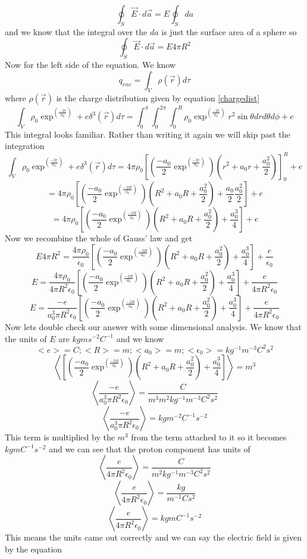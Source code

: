 \documentclass[11pt]{article}
\numberwithin{equation}{section}
\newcommand{\expmess}{\exp^{\left(\frac{-2r}{a_0}\right)}}
\begin{document}
\begin{enumerate}[(a)]
$$\oint_S \vec{E} \cdot d\vec{a} = E\oint_S da$$
and we know that the integral over the $da$ is just the surface area of a sphere so
$$\oint_S \vec{E} \cdot d\vec{a} = E4\pi R^2$$
Now for the left side of the equation. We know 
$$q_{enc} = \int_V \rho(\vec{r}) d\tau$$
where $\rho(\vec{r})$ is the charge distribution given by equation \ref{chargedist}
$$\int_V \rho_0\exp^{\left(\frac{-2r}{a_0}\right)} + e\delta^3(\vec{r})d\tau = \int_0^{\pi}\int_0^{2\pi}\int_0^R \rho_0\exp^{\left(\frac{-2r}{a_0}\right)}r^2\sin{\theta}drd\theta d\phi + e$$
This integral looks familiar. Rather than writing it again we will skip past the integration
$$\int_V \rho_0\exp^{\left(\frac{-2r}{a_0}\right)} + e\delta^3(\vec{r})d\tau = 4\pi\rho_0\left[\left(\frac{-a_0}{2}\expmess\right)\left(r^2 + a_0 r+ \frac{a_0^2}{2}\right)\right]_0^R+ e$$
$$= 4\pi\rho_0\left[\left(\frac{-a_0}{2}\exp^{\left(\frac{-2R}{a_0}\right)}\right)\left(R^2 + a_0 R+ \frac{a_0^2}{2}\right) + \frac{a_0}{2}\frac{a_0^2}{2}\right]+ e$$
$$= 4\pi\rho_0\left[\left(\frac{-a_0}{2}\exp^{\left(\frac{-2R}{a_0}\right)}\right)\left(R^2 + a_0 R+ \frac{a_0^2}{2}\right) + \frac{a_0^3}{4}\right]+ e$$
Now we recombine the whole of Gauss' law and get
$$E4\pi R^2 = \frac{4\pi\rho_0}{\epsilon_0}\left[\left(\frac{-a_0}{2}\exp^{\left(\frac{-2R}{a_0}\right)}\right)\left(R^2 + a_0 R+ \frac{a_0^2}{2}\right) + \frac{a_0^3}{4}\right]+ \frac{e}{\epsilon_0}$$
$$E = \frac{4\pi\rho_0}{4\pi R^2\epsilon_0}\left[\left(\frac{-a_0}{2}\exp^{\left(\frac{-2R}{a_0}\right)}\right)\left(R^2 + a_0 R+ \frac{a_0^2}{2}\right) + \frac{a_0^3}{4}\right]+ \frac{e}{4\pi R^2\epsilon_0}$$
$$E = \frac{-e}{a_0^3 \pi R^2\epsilon_0}\left[\left(\frac{-a_0}{2}\exp^{\left(\frac{-2R}{a_0}\right)}\right)\left(R^2 + a_0 R+ \frac{a_0^2}{2}\right) + \frac{a_0^3}{4}\right]+ \frac{e}{4\pi R^2\epsilon_0}$$
Now lets double check our answer with some dimensional analysis. We know that the units of $E$ are $kg m s^{-2} C^{-1}$ and we know 
$$<e> = C; <R> = m; <a_0> = m; <\epsilon_0> = kg^{-1} m^{-3}C^2s^2$$
$$\left<\left[\left(\frac{-a_0}{2}\exp^{\left(\frac{-2R}{a_0}\right)}\right)\left(R^2 + a_0 R+ \frac{a_0^2}{2}\right) + \frac{a_0^3}{4}\right]\right> = m^{3}$$
$$\left<\frac{-e}{a_0^3 \pi R^2\epsilon_0}\right> = \frac{C}{m^3m^2kg^{-1}m^{-3}C^2s^2}$$
$$\left<\frac{-e}{a_0^3 \pi R^2\epsilon_0}\right> = kg m^{-2} C^{-1} s^{-2}$$
This term is multiplied by the $m^3$ from the term attached to it so it becomes $kg m C^{-1}s^{-2}$  and we can see that the proton component has units of
$$\left<\frac{e}{4\pi R^2\epsilon_0}\right> = \frac{C}{m^2kg^{-1} m^{-3}C^2s^2}$$
$$\left<\frac{e}{4\pi R^2\epsilon_0}\right> = \frac{kg}{m^{-1}Cs^2}$$
$$\left<\frac{e}{4\pi R^2\epsilon_0}\right> = kg m C^{-1}s^{-2}$$
This means the units came out correctly and we can say the electric field is given by the equation


\end{enumerate}
\end{document}
